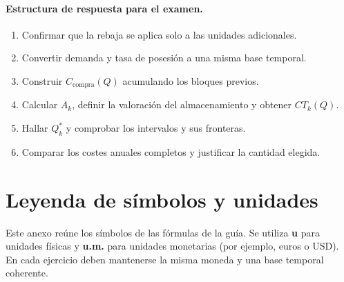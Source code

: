 \documentclass[11pt,a4paper]{article}
\begin{document}
\paragraph{Estructura de respuesta para el examen.}
\begin{enumerate}
    \item Confirmar que la rebaja se aplica solo a las unidades adicionales.
    \item Convertir demanda y tasa de posesión a una misma base temporal.
    \item Construir $C_{\text{compra}}(Q)$ acumulando los bloques previos.
    \item Calcular $A_k$, definir la valoración del almacenamiento y obtener $CT_k(Q)$.
    \item Hallar $Q_k^{*}$ y comprobar los intervalos y sus fronteras.
    \item Comparar los costes anuales completos y justificar la cantidad elegida.
\end{enumerate}

\clearpage
\appendix
\section{Leyenda de símbolos y unidades}
Este anexo reúne los símbolos de las fórmulas de la guía. Se utiliza \textbf{u} para unidades físicas y \textbf{u.m.} para unidades monetarias (por ejemplo, euros o USD). En cada ejercicio deben mantenerse la misma moneda y una base temporal coherente.
\end{document}
